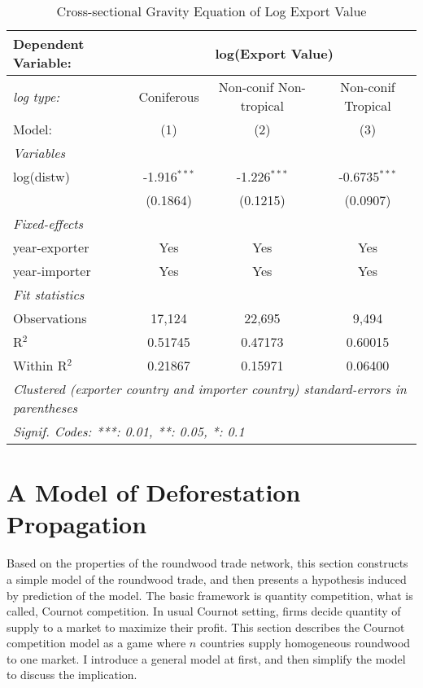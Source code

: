 \documentclass[a4paper,12pt]{article}
\begin{document}
   \begin{table}[H]
    \caption{Cross-sectional Gravity Equation of Log Export Value}
    \centering
    \begin{tabular}{lccc}
       \tabularnewline \midrule \midrule
       Dependent Variable: & \multicolumn{3}{c}{log(Export Value)}\\
       \midrule
       \textit{log type: } & Coniferous & Non-conif Non-tropical & Non-conif Tropical\\
       Model:                             & (1)            & (2)            & (3)\\  
       \midrule
       \emph{Variables}\\
       log(distw)                         & -1.916$^{***}$ & -1.226$^{***}$ & -0.6735$^{***}$\\   
       & (0.1864)       & (0.1215)       & (0.0907)\\   
        \midrule
        \emph{Fixed-effects}\\
        year-exporter  & Yes            & Yes            & Yes\\  
        year-importer   & Yes            & Yes            & Yes\\  
        \midrule
        \emph{Fit statistics}\\
        Observations                       & 17,124         & 22,695         & 9,494\\  
        R$^2$                              & 0.51745        & 0.47173        & 0.60015\\  
        Within R$^2$                       & 0.21867        & 0.15971        & 0.06400\\  
        \midrule \midrule
        \multicolumn{4}{l}{\emph{Clustered (exporter country and importer country) standard-errors in parentheses}}\\
        \multicolumn{4}{l}{\emph{Signif. Codes: ***: 0.01, **: 0.05, *: 0.1}}\\
    \end{tabular}
 \end{table}

\section{A Model of Deforestation Propagation}
Based on the properties of the roundwood trade network, this section constructs a simple model of the roundwood trade, and then presents a hypothesis induced by prediction of the model. The basic framework is quantity competition, what is called, Cournot competition. In usual Cournot setting, firms decide quantity of supply to a market to maximize their profit. This section describes the Cournot competition model as a game where $n$ countries supply homogeneous roundwood to one market. I introduce a general model at first, and then simplify the model to discuss the implication. \\
\end{document}
